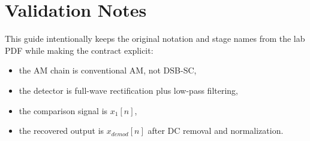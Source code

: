 \documentclass[11pt,a4paper]{article}
\begin{document}
\section*{Validation Notes}
This guide intentionally keeps the original notation and stage names from the
lab PDF while making the contract explicit:
\begin{itemize}[leftmargin=1.5em]
  \item the AM chain is conventional AM, not DSB-SC,
  \item the detector is full-wave rectification plus low-pass filtering,
  \item the comparison signal is $x_1[n]$,
  \item the recovered output is $x_{demod}[n]$ after DC removal and normalization.
\end{itemize}
\end{document}
